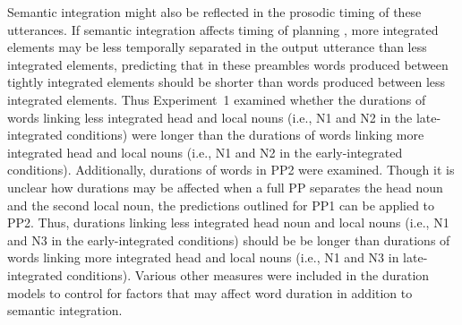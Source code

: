 \documentclass[12pt,titlepage]{article}
\newcommand{\IGNORE}[1]{} %
\begin{document}
\IGNORE{However, if breaks are produced as a response to recovery after planning long constituents \cite{WatsonEtAl06}, speakers may be unlikely to produce breaks after the head NP because there would be very little need for recovery at that point in the utterance. Thus, a difference in break production may only be observed after PP1, with more breaks produced after PP1 in the early-integrated conditions than in the late-integrated conditions.}

\IGNORE{the early-integrated the head NP and PP2 have two reasons to be planned farther apart in time: loose integration and large separation in the output utterance. }

\IGNORE{Given the findings of Watson and colleagues \cite{BreenEtAl10, WatsonEtAl06, WatsonGibson04}, speakers should be most likely to prosodically separate the early-integrated PP2 from NP. In other words, more breaks should be observed after PP1 in the early-integrated condition than in the late-integrated condition.}

Semantic integration might also be reflected in the prosodic timing of these utterances. If semantic integration affects timing of planning \cite{GillespiePearlmutter11, SolomonPearlmutter04}, more integrated elements may be less temporally separated in the output utterance than less integrated elements, predicting that in these preambles words produced between tightly integrated elements should be shorter than words produced between less integrated elements.\IGNORE{  In these preambles, words produced between the head noun and the first local noun should be shorter in the early-integrated condition than in the late-integrated condition.} Thus Experiment~1 examined whether the durations of words linking less integrated head and local nouns (i.e., N1 and N2 in the late-integrated conditions) were longer than the durations of words linking more integrated head and local nouns (i.e., N1 and N2 in the early-integrated conditions). Additionally, durations of words in PP2 were examined. Though it is unclear how durations may be affected when a full PP separates the head noun and the second local noun, the predictions outlined for PP1 can be applied to PP2. Thus, durations linking less integrated head noun and local nouns (i.e., N1 and N3 in the early-integrated conditions) should be be longer than durations of words linking more integrated head and local nouns (i.e., N1 and N3 in late-integrated conditions).  Various other measures were included in the duration models to control for factors that may affect word duration in addition to semantic integration.
\end{document}
